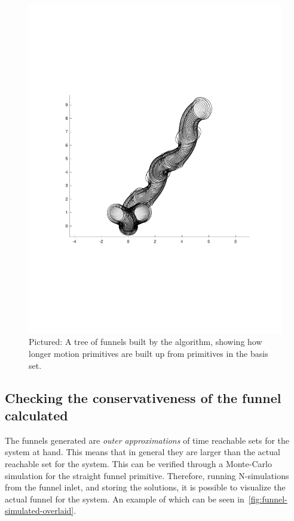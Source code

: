 \begin{figure}
  \centering \includegraphics[scale=.5]{figures/method/funnel-tree}
  \caption{Pictured: A tree of funnels built by the \rrtfunnel{} algorithm,
    showing how longer motion primitives are built up from primitives in the
    basis set.}
  \label{fig:funnel-composition-tree}
\end{figure}

\subsection{Checking the conservativeness of the funnel calculated}

The funnels generated are \textit{outer approximations} of time reachable sets
for the system at hand. This means that in general they are larger than the
actual reachable set for the system. This can be verified through a Monte-Carlo
simulation for the straight funnel primitive. Therefore, running N-simulations
from the funnel inlet, and storing the solutions, it is possible to visualize
the actual funnel for the system. An example of which can be seen
in~\cref{fig:funnel-simulated-overlaid}.

